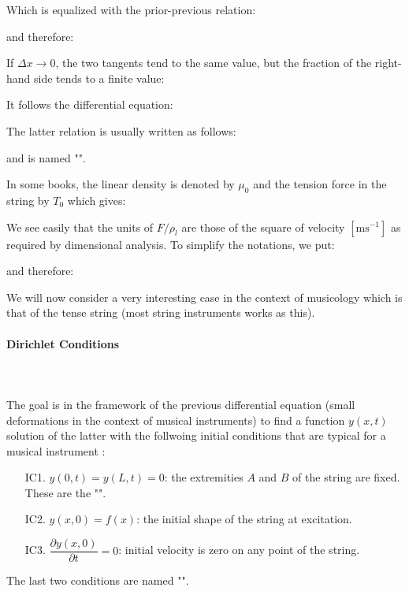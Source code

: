 	Which is equalized with the prior-previous relation:
	
	and therefore:
	
	If $\Delta x\rightarrow 0$, the two tangents tend to the same value, but the fraction of the right-hand side tends to a finite value:
	
	It follows the differential equation:
	
	
	The latter relation is usually written as follows:
	
	and is named "".
	
	\begin{tcolorbox}[title=Remark,colframe=black,arc=10pt]
	In some books, the linear density is denoted by $\mu_0$ and the tension force in the string by $T_0$ which gives:
	
	\end{tcolorbox}
	We see easily that the units of $F/\rho_l$  are those of the square of velocity $[\text{ms}^{-1}]$ as required by dimensional analysis. To simplify the notations, we put:
	
	and therefore:
	
	We will now consider a very interesting case in the context of musicology which is that of the tense string (most string instruments works as this).
	
	\paragraph{Dirichlet Conditions}\mbox{}\\\\
	The goal is in the framework of the previous differential equation (small deformations in the context of musical instruments) to find a function $y(x, t)$ solution of the latter with the follwoing initial conditions that are typical for a musical instrument :
	\begin{enumerate}
		\item[IC1.] $y(0,t)=y(L,t)=0$: the extremities $A$ and $B$ of the string are fixed. These are the "".

		\item[IC2.] $y(x,0)=f(x)$: the initial shape of the string at excitation.

		\item[IC3.] $\dfrac{\partial y(x,0)}{\partial t}=0$: initial velocity is zero on any point of the string.
	\end{enumerate}
	The last two conditions are named "".
	
